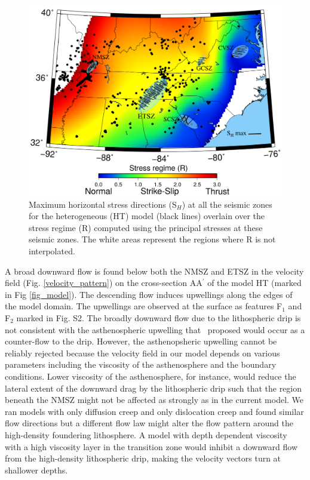 \documentclass[draft,linenumbers]{agujournal2018}
\begin{document}
\begin{figure}[h!]
    \centering
    \includegraphics[width=0.75\linewidth]{figures/sigma1.png}
    \caption{Maximum horizontal stress directions (S$_H$) at all the seismic zones for the heterogeneous (HT) model (black lines) overlain over the stress regime (R) computed using the principal stresses at these seismic zones. The white areas represent the regions where R is not interpolated.}
    \label{sigma1}
\end{figure}

A broad downward flow is found below both the NMSZ and ETSZ in the velocity field (Fig. \ref{velocity_pattern}) on the cross-section AA$^{\prime}$ of the model HT (marked in Fig \ref{fig_model}). The descending flow induces upwellings along the edges of the model domain. The upwellings are observed at the surface as features F$_1$ and F$_2$ marked in Fig. S2. The broadly downward flow due to the lithospheric drip is not consistent with the asthenospheric upwelling that~\citet{Biryol_2016} proposed would occur as a counter-flow to the drip. However, the asthenopsheric upwelling cannot be reliably rejected because the velocity field in our model depends on various parameters including the viscosity of the asthenosphere and the boundary conditions. Lower viscosity of the asthenosphere, for instance, would reduce the lateral extent of the downward drag by the lithospheric drip such that the region beneath the NMSZ might not be affected as strongly as in the current model. We ran models with only diffusion creep and only dislocation creep and found similar flow directions  but a different flow law might alter the flow pattern around the high-density foundering lithosphere. A model with depth dependent viscosity with a high viscosity layer in the transition zone would inhibit a downward flow from the high-density lithospheric drip, making the velocity vectors turn at shallower depths.
\end{document}
